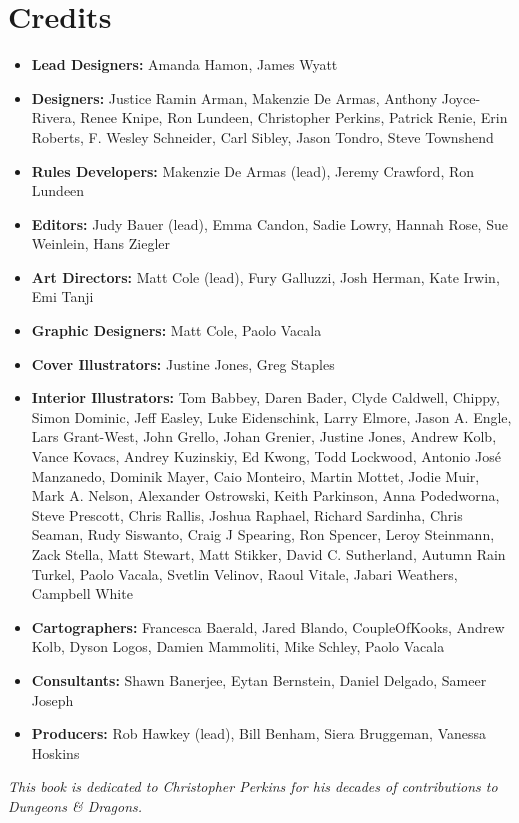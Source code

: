 \documentclass[letterpaper, 11pt, twocolumn]{dndbook}
\begin{document}





\chapter{Credits}\label{ch:credits-3-3}

\begin{itemize}
\item \textbf{Lead Designers:} Amanda Hamon, James Wyatt
\item \textbf{Designers:} Justice Ramin Arman, Makenzie De Armas, Anthony Joyce-Rivera, Renee Knipe, Ron Lundeen, Christopher Perkins, Patrick Renie, Erin Roberts, F. Wesley Schneider, Carl Sibley, Jason Tondro, Steve Townshend
\item \textbf{Rules Developers:} Makenzie De Armas (lead), Jeremy Crawford, Ron Lundeen
\item \textbf{Editors:} Judy Bauer (lead), Emma Candon, Sadie Lowry, Hannah Rose, Sue Weinlein, Hans Ziegler
\item \textbf{Art Directors:} Matt Cole (lead), Fury Galluzzi, Josh Herman, Kate Irwin, Emi Tanji
\item \textbf{Graphic Designers:} Matt Cole, Paolo Vacala
\item \textbf{Cover Illustrators:} Justine Jones, Greg Staples
\item \textbf{Interior Illustrators:} Tom Babbey, Daren Bader, Clyde Caldwell, Chippy, Simon Dominic, Jeff Easley, Luke Eidenschink, Larry Elmore, Jason A. Engle, Lars Grant-West, John Grello, Johan Grenier, Justine Jones, Andrew Kolb, Vance Kovacs, Andrey Kuzinskiy, Ed Kwong, Todd Lockwood, Antonio José Manzanedo, Dominik Mayer, Caio Monteiro, Martin Mottet, Jodie Muir, Mark A. Nelson, Alexander Ostrowski, Keith Parkinson, Anna Podedworna, Steve Prescott, Chris Rallis, Joshua Raphael, Richard Sardinha, Chris Seaman, Rudy Siswanto, Craig J Spearing, Ron Spencer, Leroy Steinmann, Zack Stella, Matt Stewart, Matt Stikker, David C. Sutherland, Autumn Rain Turkel, Paolo Vacala, Svetlin Velinov, Raoul Vitale, Jabari Weathers, Campbell White
\item \textbf{Cartographers:} Francesca Baerald, Jared Blando, CoupleOfKooks, Andrew Kolb, Dyson Logos, Damien Mammoliti, Mike Schley, Paolo Vacala
\item \textbf{Consultants:} Shawn Banerjee, Eytan Bernstein, Daniel Delgado, Sameer Joseph
\item \textbf{Producers:} Rob Hawkey (lead), Bill Benham, Siera Bruggeman, Vanessa Hoskins
\end{itemize}
\textit{This book is dedicated to Christopher Perkins for his decades of contributions to Dungeons \& Dragons.}
\end{document}
